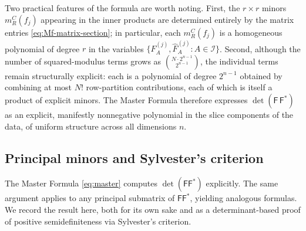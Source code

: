 \documentclass[11pt]{amsart}
\begin{document}
Two practical features of the formula are worth noting. First, the $r \times r$ minors $m_R^C(f_j)$ appearing in the inner products are determined entirely by the matrix entries \eqref{eq:Mf-matrix-section}; in particular, each $m_R^C(f_j)$ is a homogeneous polynomial of degree $r$ in the variables $\{F_A^{(j)}, \hat F_A^{(j)} : A \in \mathcal I\}$. Second, although the number of squared-modulus terms grows as $\binom{N \cdot 2^{n-1}}{2^{n-1}}$, the individual terms remain structurally explicit: each is a polynomial of degree $2^{n-1}$ obtained by combining at most $N!$ row-partition contributions, each of which is itself a product of explicit minors. The Master Formula therefore expresses $\det(\mathsf{F}\,\mathsf{F}^{\ast})$ as an explicit, manifestly nonnegative polynomial in the slice components of the data, of uniform structure across all dimensions $n$.

\subsection{Principal minors and Sylvester's criterion}

The Master Formula \eqref{eq:master} computes $\det(\mathsf{F} \mathsf{F}^{\ast})$ explicitly. The same argument applies to any principal submatrix of $\mathsf{F} \mathsf{F}^*$, yielding analogous formulas. We record the result here, both for its own sake and as a determinant-based proof of positive semidefiniteness via Sylvester's criterion.
\end{document}
